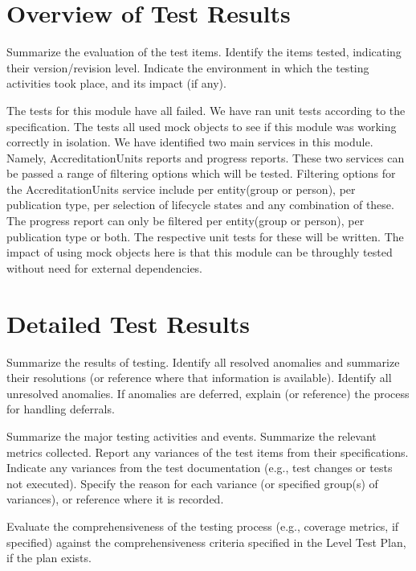 
\section{Overview of Test Results}
\label{sec:overviewResults}

Summarize the evaluation of the test items. Identify the items tested, indicating their version/revision
level. Indicate the environment in which the testing activities took place, and its impact (if any).

The tests for this module have all failed. We have ran unit tests according to the specification. The tests all used mock objects to see if this module was working correctly in isolation. We have identified two main services in this module. Namely, AccreditationUnits reports and  progress reports. These two services can be passed a range of filtering options which will be tested. Filtering options for the AccreditationUnits service include per entity(group or person), per publication type, per selection of lifecycle states and any combination of these. The progress report can only be filtered per entity(group or person), per publication type or both. The respective unit tests for these will be written. The impact of using mock objects here is that this module can be throughly tested without need for external dependencies. 


\section{Detailed Test Results} 
\label{sec:detailedResults} 
Summarize the results of testing. Identify all resolved anomalies and summarize their resolutions (or
reference where that information is available). Identify all unresolved anomalies. If anomalies are
deferred, explain (or reference) the process for handling deferrals.\par

Summarize the major testing activities and events. Summarize the relevant metrics collected.
Report any variances of the test items from their specifications. Indicate any variances from the test
documentation (e.g., test changes or tests not executed). Specify the reason for each variance (or
specified group(s) of variances), or reference where it is recorded.\par

Evaluate the comprehensiveness of the testing process (e.g., coverage metrics, if specified) against the
comprehensiveness criteria specified in the Level Test Plan, if the plan exists.
